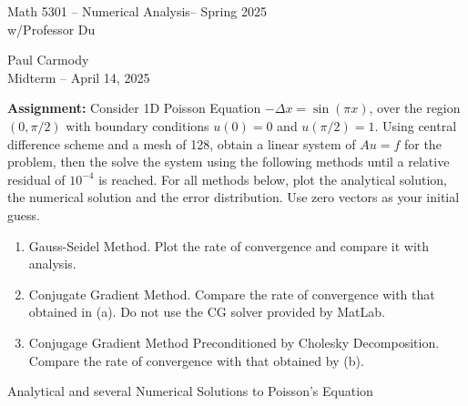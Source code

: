 \documentclass[12pt,a4paper]{report}
\newcommand{\CLASSNAME}{Math 5301 -- Numerical Analysis}
\newcommand{\STUDENTNAME}{Paul Carmody}
\newcommand{\ASSIGNMENT}{Midterm }
\newcommand{\DUEDATE}{April 14, 2025}
\newcommand{\SEMESTER}{Spring 2025}
\begin{document}

\begin{center}
	\Large{\CLASSNAME -- \SEMESTER} \\
	\large{ w/Professor Du}
\end{center}
\begin{center}
	\STUDENTNAME \\
	\ASSIGNMENT -- \DUEDATE\\
\end{center} 
\HLINE

\textbf{Assignment:} Consider 1D Poisson Equation $-\Delta x = \sin (\pi x)$, over the region $(0, \pi/2)$ with boundary conditions $u(0)=0$ and $u(\pi/2)=1$.  Using central difference scheme and a mesh of 128, obtain a linear system of $Au = f$ for the problem, then the solve the system using the following methods until a relative residual of $10^{-4}$ is reached. For all methods below, plot the analytical solution, the numerical solution and the error distribution.  Use zero vectors as your initial guess.

\begin{enumerate}[label=(\alph*)]
\item Gauss-Seidel Method.  Plot the rate of convergence and compare it with analysis.
\item Conjugate Gradient Method. Compare the rate of convergence with that obtained in (a).  Do not use the CG solver provided by MatLab.
\item Conjugage Gradient Method Preconditioned by Cholesky Decomposition.  Compare the rate of convergence with that obtained by (b).

\end{enumerate}
\HLINE
%
%
%
%
\begin{center}
	\Large{Analytical and several Numerical Solutions to Poisson's Equation}\\
\end{center}
\end{document}
